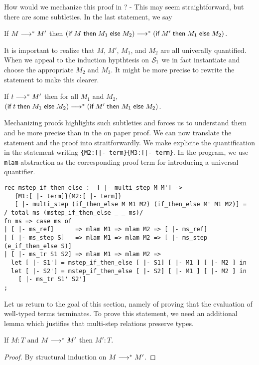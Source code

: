 How would we mechanize this proof in \beluga? - This may seem
straightforward, but there are some subtleties. In the last statement,
we say

\begin{center}
If $M \MSteps M'$ then $(\tmif M {M_1} {M_2}) \MSteps (\tmif {M'} {M_1} {M_2})$.
\end{center}

It is important to realize that $M$, $M'$, $M_1$, and $M_2$ are all
univerally quantified.  When we appeal to the induction hypthtesis on
$\S_1$ we in fact instantiate and choose the appropriate $M_2$ and
$M_3$. It might be more precise to rewrite the statement to make this clearer.

\begin{center}
If $t \MSteps M'$ then for all $M_1$ and $M_2$, $(\tmif t {M_1} {M_2}) \MSteps (\tmif {M'} {M_1} {M_2})$.
\end{center}

Mechanizing proofs highlights such subtleties and forces us to
understand them and be more precise than in the on paper proof. We can
now translate the statement and the proof into
\beluga straitforwardly. We make explicite the quantification in the
statement writing \lstinline!{M2:[|- term}{M3:[|- term}!. In the
program, we use \lstinline!mlam!-abstraction as the corresponding
proof term for introducing a universal quantifier.

\begin{lstlisting}
rec mstep_if_then_else :  [ |- multi_step M M'] ->
   {M1:[ |- term]}{M2:[ |- term]}
   [ |- multi_step (if_then_else M M1 M2) (if_then_else M' M1 M2)] =
/ total ms (mstep_if_then_else _ _ ms)/
fn ms => case ms of
| [ |- ms_ref]      => mlam M1 => mlam M2 => [ |- ms_ref]
| [ |- ms_step S]   => mlam M1 => mlam M2 => [ |- ms_step (e_if_then_else S)]
| [ |- ms_tr S1 S2] => mlam M1 => mlam M2 =>
  let [ |- S1'] = mstep_if_then_else [ |- S1] [ |- M1 ] [ |- M2 ] in
  let [ |- S2'] = mstep_if_then_else [ |- S2] [ |- M1 ] [ |- M2 ] in
    [ |- ms_tr S1' S2']
;
\end{lstlisting}


Let us return to the goal of this section, namely of proving that the
evaluation of well-typed terms terminates. To prove this statement, we
need an additional lemma which justifies that multi-step relations
preserve types.

\begin{lemma}
If $M : T$ and $M \MSteps M'$ then $M':T$.
\end{lemma}
\begin{proof}
By structural induction on $M \MSteps M'$.
\end{proof}

